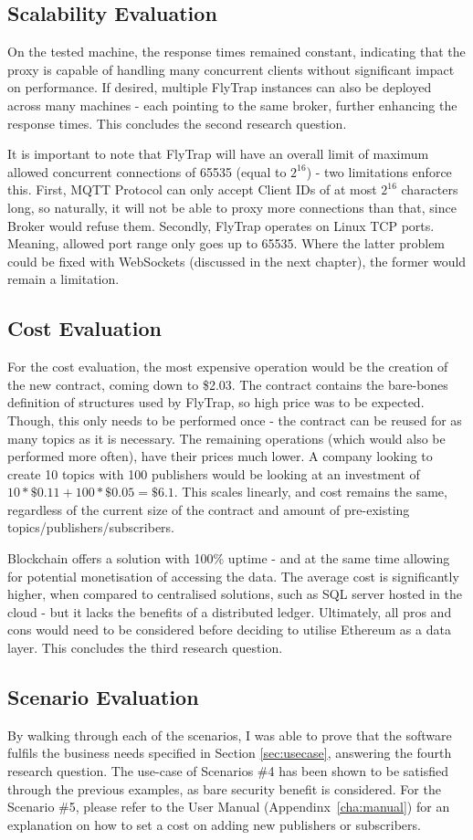 \subsection{Scalability Evaluation}
On the tested machine, the response times remained constant, indicating that the proxy is capable of handling many concurrent clients without significant impact on performance. If desired, multiple FlyTrap instances can also be deployed across many machines - each pointing to the same broker, further enhancing the response times. This concludes the second research question.

It is important to note that FlyTrap will have an overall limit of maximum allowed concurrent connections of 65535 (equal to $2^{16}$) - two limitations enforce this. First, MQTT Protocol can only accept Client IDs of at most $2^{16}$ characters long, so naturally, it will not be able to proxy more connections than that, since Broker would refuse them. Secondly, FlyTrap operates on Linux TCP ports. Meaning, allowed port range only goes up to 65535. Where the latter problem could be fixed with WebSockets (discussed in the next chapter), the former would remain a limitation.
\subsection{Cost Evaluation}
For the cost evaluation, the most expensive operation would be the creation of the new contract, coming down to \$2.03. The contract contains the bare-bones definition of structures used by FlyTrap, so high price was to be expected. Though, this only needs to be performed once - the contract can be reused for as many topics as it is necessary. The remaining operations (which would also be performed more often), have their prices much lower. A company looking to create 10 topics with 100 publishers would be looking at an investment of $10 * \$0.11 + 100 * \$0.05 = \$6.1$. This scales linearly, and cost remains the same, regardless of the current size of the contract and amount of pre-existing topics/publishers/subscribers.

Blockchain offers a solution with 100\% uptime - and at the same time allowing for potential monetisation of accessing the data. The average cost is significantly higher, when compared to centralised solutions, such as SQL server hosted in the cloud - but it lacks the benefits of a distributed ledger. Ultimately, all pros and cons would need to be considered before deciding to utilise Ethereum as a data layer. This concludes the third research question.
\subsection{Scenario Evaluation}
By walking through each of the scenarios, I was able to prove that the software fulfils the business needs specified in Section \ref{sec:usecase}, answering the fourth research question. The use-case of Scenarios \#4 has been shown to be satisfied through the previous examples, as bare security benefit is considered. For the Scenario \#5, please refer to the User Manual (Appendinx~\ref{cha:manual}) for an explanation on how to set a cost on adding new publishers or subscribers.
